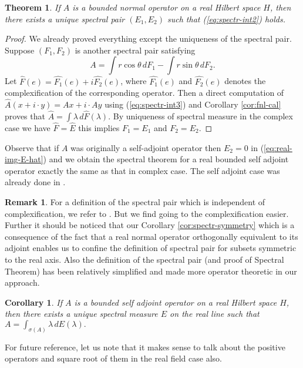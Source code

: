 \documentclass[12pt,a4paper,twoside]{article}
\numberwithin{equation}{section}
\theoremstyle{definition}  %
\newtheorem{rmk}[defn]{Remark}
\theoremstyle{plain}  %
\newtheorem{thm}[defn]{Theorem}
\newtheorem{cor}[defn]{Corollary}
\theoremstyle{remark} %
\begin{document}
\begin{thm}\label{thm:spectral-normal}
  If $A$ is a bounded normal operator on a real Hilbert space $H$, then there exists a unique spectral pair $(E_{1}, E_{2})$ such that (\ref{eq:spectr-int2}) holds.
\end{thm}
\begin{proof}
 We already proved everything except the uniqueness of the spectral pair. Suppose $(F_{1},F_{2})$ is another spectral pair satisfying
\begin{equation}\label{eq:spectr-int3}
A =\int\! r\cos\theta \, dF_{1}-\int\! r\sin\theta \, dF_{2} .
\end{equation}
  Let $\hat{F}(e)= \hat{F_{1}}(e)+ i\hat{F_{2}}(e)$, where $\hat{F_{1}}(e)$ and $\hat{F_{2}}(e)$ denotes the complexification of the corresponding operator. Then a direct computation of $\hat{A}(x+i\cdot y) = Ax + i \cdot Ay$ using (\ref{eq:spectr-int3}) and Corollary \ref{cor:fnl-cal} proves that $\hat{A} = \int\! \lambda \, d\hat{F}(\lambda)$. By uniqueness of spectral measure in the complex case we have $\hat{F}= \hat{E}$ this implies $F_{1} = E_{1}$ and $F_{2} = E_{2}$.
\end{proof}
 Observe that if $A$ was originally a self-adjoint operator then $E_{2} = 0$ in (\ref{eq:real-img-E-hat}) and we obtain the spectral theorem for a real bounded self adjoint operator exactly the same as that in complex case. The self adjoint case was already done in \cite{RiN90}.
 \begin{rmk}
 For a definition of the spectral pair which is independent of complexification, we refer to \cite{Goo72}. But we find going to the complexification easier. Further it should be noticed that our Corollary \ref{cor:spectr-symmetry} which is a consequence of the fact that a real normal operator orthogonally equivalent to its adjoint enables us to confine the definition of spectral pair  for subsets symmetric to the real axis. Also the definition of the spectral pair (and proof of Spectral Theorem) has been relatively simplified and made more operator theoretic in our approach.
 \end{rmk}
\begin{cor}
  If $A$ is a bounded self adjoint operator on a real Hilbert space $H$, then there exists a unique spectral measure $E$ on the real line such that $A= \int_{\sigma(A)}\lambda \,dE(\lambda).$
\end{cor}
For future reference, let us note that it makes sense to talk about the positive operators and square root of them in the real field case also.
\end{document}
